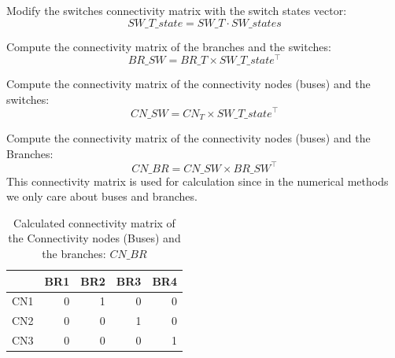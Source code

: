 \documentclass[nols,a4paper,twoside,notoc,fleqn]{tufte-book}
\begin{document}
Modify the switches connectivity matrix with the switch states vector:
\begin{equation}
SW\_T\_state = SW\_T \cdot SW\_states
\end{equation}

Compute the connectivity matrix of the branches and the switches:
\begin{equation}
BR\_SW = BR\_T \times SW\_T\_state^\top
\end{equation}

Compute the connectivity matrix of the connectivity nodes (buses) and the switches:
\begin{equation}
CN\_SW = CN_T \times SW\_T\_state^\top
\end{equation}

Compute the connectivity matrix of the connectivity nodes (buses) and the Branches:
\begin{equation}
CN\_BR = CN\_SW \times BR\_SW^\top
\end{equation}
This connectivity matrix is used for calculation since in the numerical methods we only care about buses and branches.


\begin{table}[ht]
\begin{tabular}{lrrrr}
	\toprule
	{} &  BR1 &  BR2 &  BR3 &  BR4 \\
	\midrule
	CN1 &    0 &    1 &    0 &    0 \\
	CN2 &    0 &    0 &    1 &    0 \\
	CN3 &    0 &    0 &    0 &    1 \\
	\bottomrule
\end{tabular}
\caption{Calculated connectivity matrix of the Connectivity nodes (Buses) and the branches: $CN\_BR$}
\end{table}

%
\end{document}
